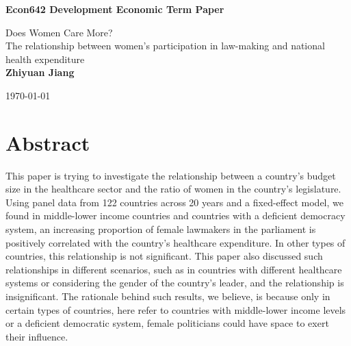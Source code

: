 \begin{titlepage}
\begin{center}
\vspace*{1cm}
\Huge
\textbf{Econ642 Development Economic Term Paper}

\vspace{0.5cm}
\LARGE
Does Women Care More?\\
The relationship between women's participation in law-making and national health expenditure
\\

\vspace{1.5 cm}
\textbf{Zhiyuan Jiang\\}
\vfill

\vspace{0.8cm}
 
\Large
\today
\end{center}
\end{titlepage}


\section*{Abstract}

This paper is trying to investigate the relationship between a country's budget size in the healthcare sector and the ratio of women in the country's legislature. 
Using panel data from 122 countries across 20 years and a fixed-effect model, we found in middle-lower income countries and countries with a deficient democracy system, an increasing proportion of female lawmakers in the parliament is positively correlated with the country's healthcare expenditure.
In other types of countries, this relationship is not significant.
This paper also discussed such relationships in different scenarios, such as in countries with different healthcare systems or considering the gender of the country's leader, and the relationship is insignificant. 
The rationale behind such results, we believe, is because only in certain types of countries, here refer to countries with middle-lower income levels or a deficient democratic system, female politicians could have space to exert their influence. 
